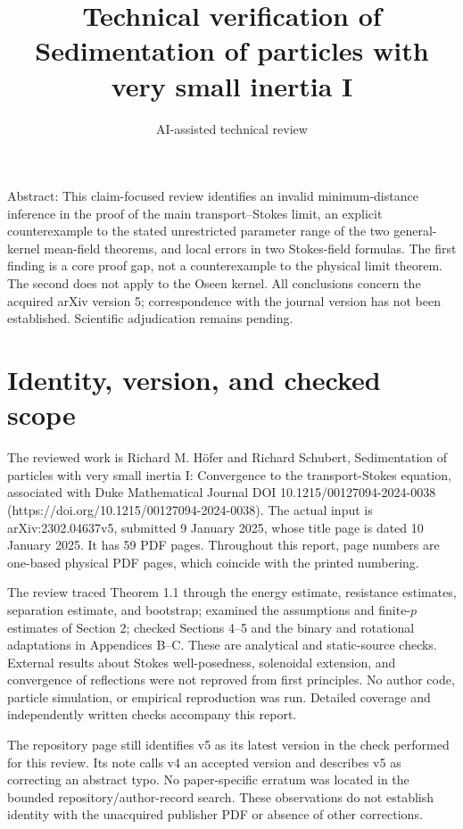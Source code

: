 \documentclass[10pt]{article}
\title{Technical verification of
Sedimentation of particles with very small inertia I}
\author{AI-assisted technical review}
\date{}
\begin{document}
\maketitle
Abstract: This claim-focused review identifies an invalid minimum-distance inference in the proof of the main transport–Stokes limit, an explicit counterexample to the stated unrestricted parameter range of the two general-kernel mean-field theorems, and local errors in two Stokes-field formulas. The first finding is a core proof gap, not a counterexample to the physical limit theorem. The second does not apply to the Oseen kernel. All conclusions concern the acquired arXiv version 5; correspondence with the journal version has not been established. Scientific adjudication remains pending.\par
\section*{Identity, version, and checked scope}
The reviewed work is Richard M. Höfer and Richard Schubert, Sedimentation of particles with very small inertia I: Convergence to the transport-Stokes equation, associated with Duke Mathematical Journal DOI 10.1215/00127094-2024-0038 (https://doi.org/10.1215/00127094-2024-0038). The actual input is arXiv:2302.04637v5, submitted 9 January 2025, whose title page is dated 10 January 2025. It has 59 PDF pages. Throughout this report, page numbers are one-based physical PDF pages, which coincide with the printed numbering.\par
The review traced Theorem 1.1 through the energy estimate, resistance estimates, separation estimate, and bootstrap; examined the assumptions and finite-\(p\) estimates of Section 2; checked Sections 4–5 and the binary and rotational adaptations in Appendices B–C. These are analytical and static-source checks. External results about Stokes well-posedness, solenoidal extension, and convergence of reflections were not reproved from first principles. No author code, particle simulation, or empirical reproduction was run. Detailed coverage and independently written checks accompany this report.\par
The repository page still identifies v5 as its latest version in the check performed for this review. Its note calls v4 an accepted version and describes v5 as correcting an abstract typo. No paper-specific erratum was located in the bounded repository/author-record search. These observations do not establish identity with the unacquired publisher PDF or absence of other corrections.\par
\end{document}
